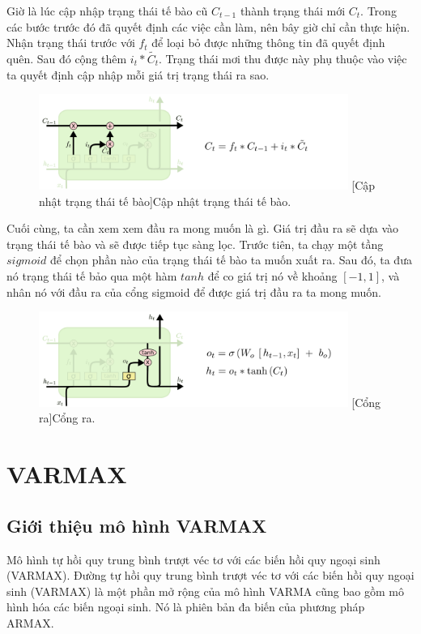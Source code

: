 \par
Giờ là lúc cập nhập trạng thái tế bào cũ $C_{t-1}$  thành trạng thái mới $C_t$. Trong các bước trước đó đã quyết định các việc cần làm, nên bây giờ chỉ cần thực hiện.\\
Nhận trạng thái trước với $f_t$ để loại bỏ được những thông tin đã quyết định quên. Sau đó cộng thêm $i_t*\tilde{C_t}$. Trạng thái mơi thu được này phụ thuộc vào việc ta quyết định cập nhập mỗi giá trị trạng thái ra sao.\\
\begin{figure}[H]
\centering
	\includegraphics[width=0.9\textwidth]{figures/LSTM3-focus-C.png}
	[Cập nhật trạng thái tế bào]{Cập nhật trạng thái tế bào.}
\end{figure}

\par
Cuối cùng, ta cần xem xem đầu ra mong muốn là gì. Giá trị đầu ra sẽ dựa vào trạng thái tế bào và sẽ được tiếp tục sàng lọc. Trước tiên, ta chạy một tầng $sigmoid$ để chọn phần nào của trạng thái tế bào ta muốn xuất ra. Sau đó, ta đưa nó trạng thái tế bảo qua một hàm $tanh$ để co giá trị nó về khoảng $[-1, 1]$, và nhân nó với đầu ra của cổng sigmoid để được giá trị đầu ra ta mong muốn.
\begin{figure}[H]
\centering
	\includegraphics[width=0.9\textwidth]{figures/LSTM3-focus-o.png}
	[Cổng ra]{Cổng ra.}
\end{figure}

\section{VARMAX}
\subsection{Giới thiệu mô hình VARMAX}
Mô hình tự hồi quy trung bình trượt véc tơ với các biến hồi quy ngoại sinh (VARMAX). Đường tự hồi quy trung bình trượt véc tơ với các biến hồi quy ngoại sinh (VARMAX) là một phần mở rộng của mô hình VARMA cũng bao gồm mô hình hóa các biến ngoại sinh. Nó là phiên bản đa biến của phương pháp ARMAX.

